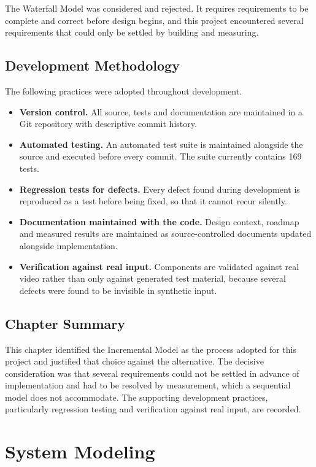 \documentclass[12pt,a4paper,twoside]{report}
\begin{document}
The Waterfall Model was considered and rejected. It requires requirements to be complete and correct before design begins, and this project encountered several requirements that could only be settled by building and measuring.

\section{Development Methodology}

The following practices were adopted throughout development.

\begin{itemize}
\item \textbf{Version control.} All source, tests and documentation are maintained in a Git repository with descriptive commit history.
\item \textbf{Automated testing.} An automated test suite is maintained alongside the source and executed before every commit. The suite currently contains 169 tests.
\item \textbf{Regression tests for defects.} Every defect found during development is reproduced as a test before being fixed, so that it cannot recur silently.
\item \textbf{Documentation maintained with the code.} Design context, roadmap and measured results are maintained as source-controlled documents updated alongside implementation.
\item \textbf{Verification against real input.} Components are validated against real video rather than only against generated test material, because several defects were found to be invisible in synthetic input.
\end{itemize}

\section{Chapter Summary}

This chapter identified the Incremental Model as the process adopted for this project and justified that choice against the alternative. The decisive consideration was that several requirements could not be settled in advance of implementation and had to be resolved by measurement, which a sequential model does not accommodate. The supporting development practices, particularly regression testing and verification against real input, are recorded.

\chapter{System Modeling}
\end{document}
